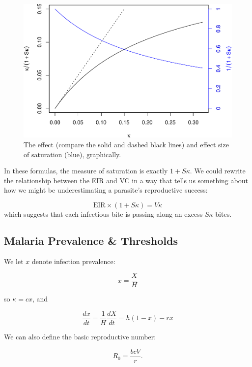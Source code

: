 \documentclass[
]{book}
\begin{document}
\begin{figure}
\centering
\includegraphics{_main_files/figure-latex/unnamed-chunk-11-1.pdf}
\caption{\label{fig:unnamed-chunk-11}The effect (compare the solid and dashed black lines) and effect size of saturation (blue), graphically.}
\end{figure}

In these formulas, the measure of saturation is exactly \(1+S\kappa\). We could rewrite the relationship between the EIR and VC in a way
that tells us something about how we might be underestimating a parasite's reproductive success:

\[\mbox{EIR}\times (1 + S \kappa) = V \kappa\]
which suggests that each infectious bite is passing along an excess \(S\kappa\) bites.

\hypertarget{malaria-prevalence-thresholds}{%
\subsection{Malaria Prevalence \& Thresholds}\label{malaria-prevalence-thresholds}}

We let \(x\) denote infection prevalence:

\begin{equation}
x = \frac{X}{H} 
\end{equation}

so \(\kappa = c x\), and

\begin{equation}
\frac{dx}{dt} = \frac{1}{H} \frac{dX}{dt} = h (1-x)-r x
\end{equation}

We can also define the basic reproductive number:

\begin{equation}
R_0 = \frac{bcV}{r}.
\end{equation}
\end{document}
